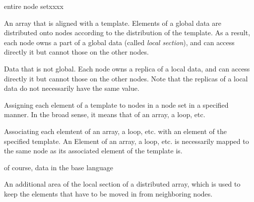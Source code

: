 \begin{namelist}{entire node setxxxx}


 An array that is aligned with a template. Elements of a global data are
 distributed onto nodes according to the distribution of the
 template. As a result, each node owns a part of a global data (called
 {\it local section}), and can access directly it but cannot those on
 the other nodes.



 Data that is not global. Each node owns a replica of a local data,
 and can access directly it but cannot those on the other nodes. Note
 that the replicas of a local data do not necessarily have the same
 value.




 Assigning each element of a template to nodes in a node set in a
 specified manner. In the broad sense, it means that of an array, a
 loop, etc.



 Associating each elemtent of an array, a loop, etc. with an element of
 the specified template. An Element of an array, a loop, etc. is
 necessarily mapped to the same node as its associated element of the
 template is.



of course, data in the base language



 An additional area of the local section of a distributed array, which
 is used to keep the elements that have to be moved in from neighboring
 nodes.


\end{namelist}


